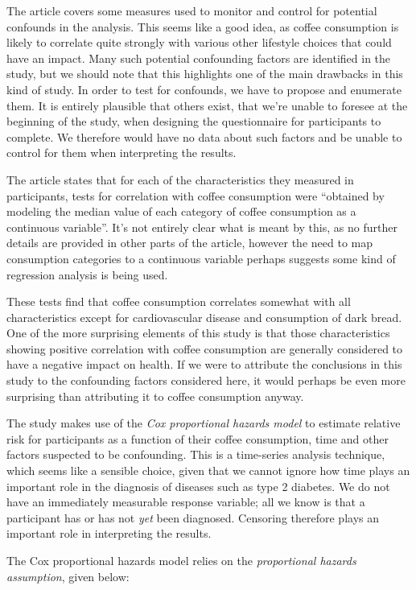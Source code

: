 \documentclass{article}
\begin{document}
The article covers some measures used to monitor and control for
potential confounds in the analysis. This seems like a good idea, as
coffee consumption is likely to correlate quite strongly with various
other lifestyle choices that could have an impact. Many such potential
confounding factors are identified in the study, but we should note
that this highlights one of the main drawbacks in this kind of
study. In order to test for confounds, we have to propose and
enumerate them. It is entirely plausible that others exist, that we're
unable to foresee at the beginning of the study, when designing the
questionnaire for participants to complete. We therefore would have no
data about such factors and be unable to control for them when
interpreting the results.

The article states that for each of the characteristics they measured
in participants, tests for correlation with coffee consumption were
``obtained by modeling the median value of each category of coffee
consumption as a continuous variable''. It's not entirely clear what
is meant by this, as no further details are provided in other parts of
the article, however the need to map consumption categories to a
continuous variable perhaps suggests some kind of regression analysis
is being used.

These tests find that coffee consumption correlates
somewhat with all characteristics except for cardiovascular disease
and consumption of dark bread. One of the more surprising elements of
this study is that those characteristics showing positive correlation
with coffee consumption are generally considered to have a negative
impact on health. If we were to attribute the conclusions in this
study to the confounding factors considered here, it would perhaps be
even more surprising than attributing it to coffee consumption anyway.

The study makes use of the \emph{Cox proportional hazards model}
\cite{cox} to estimate relative risk for participants as a function of
their coffee consumption, time and other factors suspected to be
confounding. This is a time-series analysis technique, which seems
like a sensible choice, given that we cannot ignore how time plays an
important role in the diagnosis of diseases such as type 2
diabetes. We do not have an immediately measurable response variable;
all we know is that a participant has or has not \emph{yet} been
diagnosed. Censoring therefore plays an important role in interpreting
the results.

The Cox proportional hazards model relies on the \emph{proportional
  hazards assumption}, given below:
\end{document}
